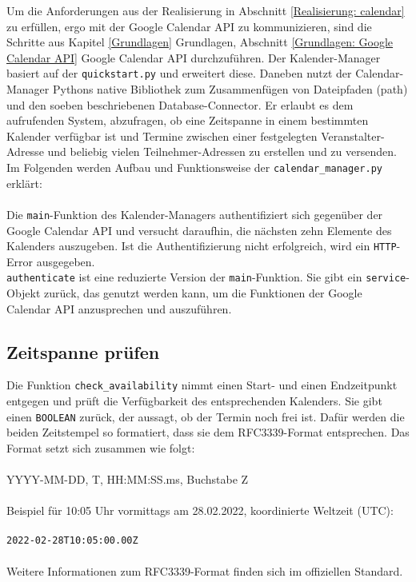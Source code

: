         \label{Implementierung: calendar_manager.py}
        Um die Anforderungen aus der Realisierung in Abschnitt \ref*{Realisierung: calendar} zu erfüllen, ergo mit der Google Calendar API zu kommunizieren, sind die Schritte aus Kapitel \ref*{Grundlagen} Grundlagen, Abschnitt \ref*{Grundlagen: Google Calendar API} Google Calendar API durchzuführen. Der Kalender-Manager basiert auf der \verb|quickstart.py| und erweitert diese. Daneben nutzt der Calendar-Manager Pythons native Bibliothek zum Zusammenfügen von Dateipfaden (path) und den soeben beschriebenen Database-Connector. Er erlaubt es dem aufrufenden System, abzufragen, ob eine Zeitspanne in einem bestimmten Kalender verfügbar ist und Termine zwischen einer festgelegten Veranstalter-Adresse und beliebig vielen Teilnehmer-Adressen zu erstellen und zu versenden. Im Folgenden werden Aufbau und Funktionsweise der \verb|calendar_manager.py| erklärt: \\ 
        \\
        Die \verb|main|-Funktion des Kalender-Managers authentifiziert sich gegenüber der Google Calendar API und versucht daraufhin, die nächsten zehn Elemente des Kalenders auszugeben. Ist die Authentifizierung nicht erfolgreich, wird ein \verb|HTTP|-Error ausgegeben.  \\
        \verb|authenticate| ist eine reduzierte Version der \verb|main|-Funktion. Sie gibt ein \verb|service|-Objekt zurück, das genutzt werden kann, um die Funktionen der Google Calendar API anzusprechen und auszuführen.\\
        
        \subsection{Zeitspanne prüfen}
            Die Funktion \verb|check_availability| nimmt einen Start- und einen Endzeitpunkt entgegen und prüft die Verfügbarkeit des entsprechenden Kalenders. Sie gibt einen \verb|BOOLEAN| zurück, der aussagt, ob der Termin noch frei ist. Dafür werden die beiden Zeitstempel so formatiert, dass sie dem RFC3339-Format entsprechen. Das Format setzt sich zusammen wie folgt: \\
            \\
            YYYY-MM-DD, \glq T\grq, HH:MM:SS.ms, Buchstabe \glq Z\grq \\
            \\
            Beispiel für 10:05 Uhr vormittags am 28.02.2022, koordinierte Weltzeit (UTC): \\
            \\
            \verb/2022-02-28T10:05:00.00Z/ \\
            \\
            Weitere Informationen zum RFC3339-Format finden sich im offiziellen Standard. \cite{date_time} \\
            
